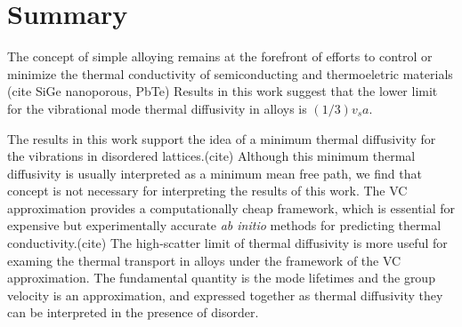\documentclass[aps,prb,onecolumn,preprint,superscriptaddress,amsmath,amssymb,floatfix]{revtex4}
\begin{document}



\section{\label{S:Summary}Summary}

The concept of simple alloying remains at the forefront of efforts  
to control or minimize the thermal conductivity of semiconducting and 
thermoeletric materials (cite SiGe nanoporous, PbTe) 
Results in this work suggest that the lower limit for the vibrational 
mode thermal diffusivity in alloys is $(1/3)v_sa$. 

The results in this work support the idea of a minimum thermal diffusivity 
for the vibrations in disordered lattices.(cite) 
Although this minimum thermal 
diffusivity is usually interpreted as a minimum mean free path, we find 
that concept is not necessary for interpreting the results of this work. 
The VC 
approximation provides a computationally cheap framework, which is 
essential for expensive but experimentally accurate \emph{ab initio} 
methods for predicting thermal conductivity.(cite) 
The high-scatter limit 
of thermal diffusivity is more useful for examing the thermal transport 
in alloys under the framework of the VC approximation. The 
fundamental quantity is the mode lifetimes and the group velocity 
is an approximation, and expressed together as thermal diffusivity 
they can be interpreted in the presence of disorder.
\end{document}
